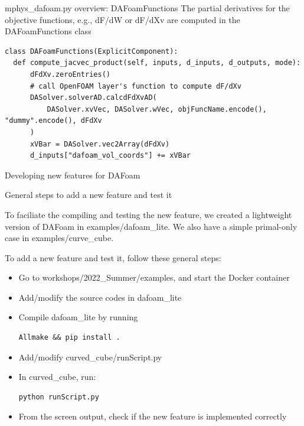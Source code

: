 \documentclass{bredelebeamer}
\begin{document}
\begin{frame}[fragile]{mphys\_dafoam.py overview: DAFoamFunctions}
The partial derivatives for the objective functions, e.g., dF/dW or dF/dXv are computed in the DAFoamFunctions class
\footnotesize
\lstset{ language=python }
\begin{lstlisting}
class DAFoamFunctions(ExplicitComponent):
  def compute_jacvec_product(self, inputs, d_inputs, d_outputs, mode):
      dFdXv.zeroEntries()
      # call OpenFOAM layer's function to compute dF/dXv
      DASolver.solverAD.calcdFdXvAD(
          DASolver.xvVec, DASolver.wVec, objFuncName.encode(), "dummy".encode(), dFdXv
      )
      xVBar = DASolver.vec2Array(dFdXv)
      d_inputs["dafoam_vol_coords"] += xVBar
\end{lstlisting}
\normalsize

\end{frame}


\begin{frame}{}
  \center \Large Developing new features for DAFoam

\end{frame}

\begin{frame}[fragile]{General steps to add a new feature and test it}

To faciliate the compiling and testing the new feature, we created a lightweight version of DAFoam in examples/dafoam\_lite. We also have a simple primal-only case in examples/curve\_cube.

To add a new feature and test it, follow these general steps:

\begin{itemize}
  \setlength\itemsep{0.5em}
  \item Go to workshops/2022\_Summer/examples, and start the Docker container
  \item Add/modify the source codes in dafoam\_lite
  \item Compile dafoam\_lite by running 
  \footnotesize
  \lstset{ language=bash }
  \begin{lstlisting}
Allmake && pip install .
  \end{lstlisting}
  \normalsize
  \item Add/modify curved\_cube/runScript.py
  \item In curved\_cube, run:
  \footnotesize
  \lstset{ language=bash }
  \begin{lstlisting}
python runScript.py
  \end{lstlisting}
  \normalsize
  \item From the screen output, check if the new feature is implemented correctly
\end{itemize}

\end{frame}
\end{document}
